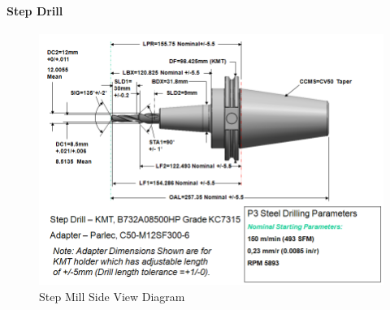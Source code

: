 \pagebreak

\paragraph{Step Drill}
\label{sec:Step Drill}

\begin{figure}[ht]
  \centering
    \includegraphics[width=1.0\textwidth]{figures/Step Mill Side View.png}
  \caption{Step Mill Side View Diagram}
  \label{fig:Step Mill Side View Diagram}
\end{figure}

\FloatBarrier


